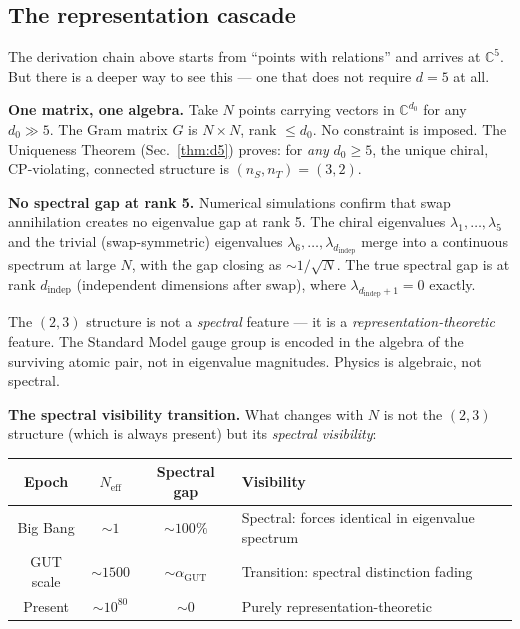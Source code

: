 \documentclass[12pt]{article}
\theoremstyle{remark}
\theoremstyle{definition}
\begin{document}
\subsection{The representation cascade}

The derivation chain above starts from ``points with relations'' and arrives at $\mathbb{C}^5$. But there is a deeper way to see this --- one that does not require $d = 5$ at all.

\textbf{One matrix, one algebra.} Take $N$ points carrying vectors in $\mathbb{C}^{d_0}$ for any $d_0 \gg 5$. The Gram matrix $G$ is $N \times N$, rank $\leq d_0$. No constraint is imposed. The Uniqueness Theorem (Sec.~\ref{thm:d5}) proves: for \emph{any} $d_0 \geq 5$, the unique chiral, CP-violating, connected structure is $(n_S, n_T) = (3, 2)$.

\textbf{No spectral gap at rank 5.} Numerical simulations confirm that swap annihilation creates no eigenvalue gap at rank 5. The chiral eigenvalues $\lambda_1, \ldots, \lambda_5$ and the trivial (swap-symmetric) eigenvalues $\lambda_6, \ldots, \lambda_{d_\text{indep}}$ merge into a continuous spectrum at large $N$, with the gap closing as $\sim 1/\sqrt{N}$. The true spectral gap is at rank $d_\text{indep}$ (independent dimensions after swap), where $\lambda_{d_\text{indep}+1} = 0$ exactly.

The $(2,3)$ structure is not a \emph{spectral} feature --- it is a \emph{representation-theoretic} feature. The Standard Model gauge group is encoded in the algebra of the surviving atomic pair, not in eigenvalue magnitudes. Physics is algebraic, not spectral.

\textbf{The spectral visibility transition.} What changes with $N$ is not the $(2,3)$ structure (which is always present) but its \emph{spectral visibility}:

\begin{center}
\begin{tabular}{cccl}
\hline
Epoch & $N_\text{eff}$ & Spectral gap & Visibility \\
\hline
Big Bang & $\sim 1$ & $\sim 100\%$ & Spectral: forces identical in eigenvalue spectrum \\
GUT scale & $\sim 1500$ & $\sim \alpha_\text{GUT}$ & Transition: spectral distinction fading \\
Present & $\sim 10^{80}$ & $\sim 0$ & Purely representation-theoretic \\
\hline
\end{tabular}
\end{center}
\end{document}
